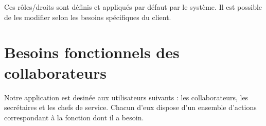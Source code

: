 \begin{small}
  Ces rôles/droits sont définis et appliqués par défaut par le système. Il est possible de les modifier selon les besoins spécifiques du client.
\end{small}


\section{Besoins fonctionnels des collaborateurs}
Notre application est desinée aux utilisateurs suivants : les collaborateurs, les secrétaires et les chefs de service. Chacun d'eux dispose d'un ensemble d'actions correspondant à la fonction dont il a besoin.

\begin{itemize}

\end{itemize}
